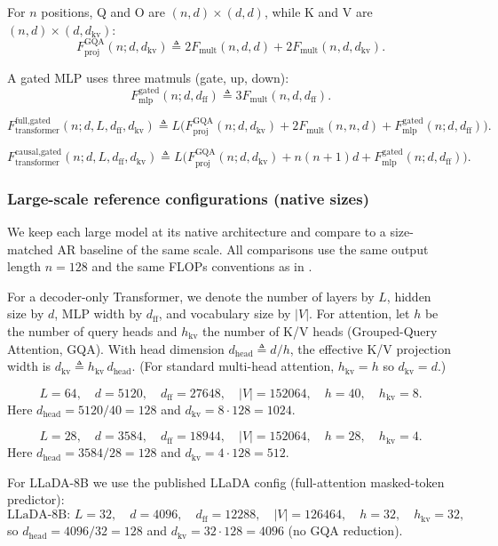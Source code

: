 \documentclass[11pt]{article}
\begin{document}
For $n$ positions, Q and O are $(n,d)\times(d,d)$, while K and V are $(n,d)\times(d,d_{\text{kv}})$:
\[
F_{\text{proj}}^{\text{GQA}}(n;d,d_{\text{kv}})
\triangleq
2F_{\text{mult}}(n,d,d) + 2F_{\text{mult}}(n,d,d_{\text{kv}}).
\]

A gated MLP uses three matmuls (gate, up, down):
\[
F_{\text{mlp}}^{\text{gated}}(n;d,d_{\text{ff}})
\triangleq
3F_{\text{mult}}(n,d,d_{\text{ff}}).
\]

\[
F_{\text{transformer}}^{\text{full,gated}}(n;d,L,d_{\text{ff}},d_{\text{kv}})
\triangleq
L\Big(
F_{\text{proj}}^{\text{GQA}}(n;d,d_{\text{kv}})
+2F_{\text{mult}}(n,n,d)
+F_{\text{mlp}}^{\text{gated}}(n;d,d_{\text{ff}})
\Big).
\]

\[
F_{\text{transformer}}^{\text{causal,gated}}(n;d,L,d_{\text{ff}},d_{\text{kv}})
\triangleq
L\Big(
F_{\text{proj}}^{\text{GQA}}(n;d,d_{\text{kv}})
+n(n+1)d
+F_{\text{mlp}}^{\text{gated}}(n;d,d_{\text{ff}})
\Big).
\]

\subsubsection{Large-scale reference configurations (native sizes)}
\label{app:diff_family_big_configs}

We keep each large model at its native architecture and compare to a size-matched AR baseline of the same scale.
All comparisons use the same output length $n=128$ and the same FLOPs conventions as in .

For a decoder-only Transformer, we denote the number of layers by $L$, hidden size by $d$, MLP width by $d_{\text{ff}}$,
and vocabulary size by $|V|$. For attention, let $h$ be the number of query heads and $h_{\text{kv}}$ the number of K/V heads
(Grouped-Query Attention, GQA). With head dimension $d_{\text{head}} \triangleq d/h$, the effective K/V projection width is
$d_{\text{kv}} \triangleq h_{\text{kv}}\,d_{\text{head}}$.
(For standard multi-head attention, $h_{\text{kv}}=h$ so $d_{\text{kv}}=d$.)

\[
L=64,\quad d=5120,\quad d_{\text{ff}}=27648,\quad |V|=152064,\quad
h=40,\quad h_{\text{kv}}=8.
\]
Here $d_{\text{head}}=5120/40=128$ and $d_{\text{kv}}=8\cdot 128=1024$.

\[
L=28,\quad d=3584,\quad d_{\text{ff}}=18944,\quad |V|=152064,\quad
h=28,\quad h_{\text{kv}}=4.
\]
Here $d_{\text{head}}=3584/28=128$ and $d_{\text{kv}}=4\cdot 128=512$.

For LLaDA-8B we use the published LLaDA config (full-attention masked-token predictor):
\[
\text{LLaDA-8B: } L=32,\quad d=4096,\quad d_{\text{ff}}=12288,\quad |V|=126464,\quad
h=32,\quad h_{\text{kv}}=32,
\]
so $d_{\text{head}}=4096/32=128$ and $d_{\text{kv}}=32\cdot 128=4096$ (no GQA reduction).
\end{document}
